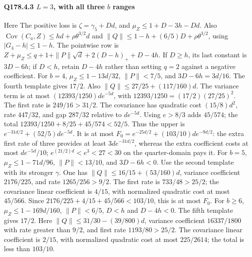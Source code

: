 \paragraph{Q178.4.3 $L=\allowbreak 3$, with all three $b$ ranges}
Here
The positive loss is $\zeta=\allowbreak \gamma_5+Dd$, and
$\mu_Z\le\allowbreak 1+D-3h-Dd$.
Also $\operatorname{Cov}(C_a,\allowbreak Z)\le\allowbreak  hd+\rho\theta^{3/2}d$ and
$\|Q\|\le\allowbreak 1-h+(6/5)D+\rho\theta^{3/2}$, using $|G_4-h|\le\allowbreak 1-h$.
The pointwise row is
$Z+\mu_Z\le\allowbreak  q+1+\|P\|\sqrt d+2(D-h)_++D-4h$.
If $D\ge\allowbreak  h$, its last constant is $3D-6h$;
if $D<\allowbreak h$, retain $D-4h$ rather than setting $q=\allowbreak 2$ against a negative coefficient.
For $b=\allowbreak 4$, $\mu_Z\le\allowbreak 1-13d/32$, $\|P\|<\allowbreak 7/5$, and
$3D-6h=\allowbreak 3d/16$. The fourth template gives $17/2$.
Also $\|Q\|\le\allowbreak 27/25+(117/160)d$.
The variance term is at most $(12393/1250)de^{-5d}$, with
$12393/1250=\allowbreak (17/2)(27/25)^2$.
The first rate is $249/16>\allowbreak 31/2$.
The covariance has quadratic cost $(15/8)d^2$, rate $447/32$,
and gap $287/32$ relative to $de^{-5d}$.
Using $e>\allowbreak 8/3$ adds $45/574$; the total
$12393/1250+8/25+45/574<\allowbreak 52/5$.
Thus the upper is $e^{-31d/2}+(52/5)de^{-5d}$.
It is at most $F_0=\allowbreak e^{-25d/2}+(103/10)de^{-9d/2}$:
the extra first rate of three provides at least $3de^{-31d/2}$,
whereas the extra coefficient costs at most $de^{-5d}/10$;
$e^{(21/2)d}<\allowbreak e^3<\allowbreak 27<\allowbreak 30$ on the quarter-domain pays it.
For $b=\allowbreak 5$, $\mu_Z\le\allowbreak 1-71d/96$, $\|P\|<\allowbreak 13/10$, and $3D-6h<\allowbreak 0$.
Use the second template with its stronger $\gamma$.
One has $\|Q\|\le\allowbreak 16/15+(53/160)d$, variance coefficient $2176/225$,
and rate $1265/256>\allowbreak 9/2$.
The first rate is $733/48>\allowbreak 25/2$; the covariance linear coefficient is
$4/15$, with normalized quadratic cost at most $45/566$.
Since $2176/225+4/15+45/566<\allowbreak 103/10$, this is at most $F_0$.
For $b\ge\allowbreak 6$, $\mu_Z\le\allowbreak 1-169d/160$, $\|P\|<\allowbreak 6/5$,
$D<\allowbreak h$ and $D-4h<\allowbreak 0$. The fifth template gives $17/2$.
Here $\|Q\|\le\allowbreak 31/30-(39/800)d$, variance coefficient $16337/1800$
with rate greater than $9/2$, and first rate $1193/80>\allowbreak 25/2$.
The covariance linear coefficient is $2/15$, with normalized quadratic
cost at most $225/2614$; the total is less than $103/10$.

